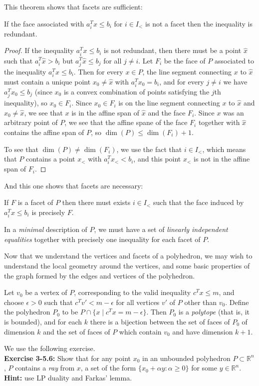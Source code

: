 \documentclass[12pt]{article}
\begin{document}
This theorem shows that facets are sufficient:
\begin{theorem}
If the face associated with $a_i^Tx\leq b_i$ for $i\in I_<$ is not a facet
then the inequality is redundant. 
\end{theorem}
\begin{proof} If the inequality $a_i^Tx \le b_i$ is not redundant, then there must be a point $\hat{x}$ such that $a_i^T\hat{x} > b_i$ but $a_j^T\hat{x} \le b_j$ for all $j \ne i$. Let $F_i$ be the face of $P$ associated to the inequality $a_i^Tx \le b_i$. Then for every $x \in P$, the line segment connecting $x$ to $\hat{x}$ must contain a unique point $x_0 \ne \hat{x}$ with $a_i^Tx_0 = b_i$, and for every $j \ne i$ we have $a_j^Tx_0 \le b_j$ (since $x_0$ is a convex combination of points satisfying the $j$th inequality), so $x_0 \in F_i$. Since $x_0 \in F_i$ is on the line segment connecting $x$ to $\hat{x}$ and $x_0 \ne \hat{x}$, we see that $x$ is in the affine span of $\hat{x}$ and the face $F_i$. Since $x$ was an arbitrary point of $P$, we see that the affine spane of the face $F_i$ together with $\hat{x}$ contains the affine span of $P$, so $\dim(P) \le \dim(F_i) + 1$.

To see that $\dim(P) \ne \dim(F_i)$, we use the fact that $i \in I_<$, which means that $P$ contains a point $x_<$ with $a_i^Tx_< < b_i$, and this point $x_<$ is not in the affine span of $F_i$.
\end{proof}

And this one shows that facets are necessary:
\begin{theorem}
If $F$ is a facet of $P$ then there must exists $i\in I_<$ such that
the face induced by $a_i^T x\leq b_i$ is precisely $F$. 
\end{theorem}

In a {\it minimal} description of $P$, we must have a set of {\it
  linearly independent equalities} together with precisely one
  inequality for each facet of $P$.

Now that we understand the vertices and facets of a polyhedron, we may wish to understand the local geometry around the vertices, and some basic properties of the graph formed by the edges and vertices of the polyhedron.

\begin{theorem} Let $v_0$ be a vertex of $P$, corresponding to the valid inequality $c^Tx \le m$, and choose $\epsilon > 0$ such that $c^Tv' < m-\epsilon$ for all vertices $v'$ of $P$ other than $v_0$. Define the polyhedron $P_0$ to be $P \cap \{x \mid c^Tx = m-\epsilon\}$. Then $P_0$ is a {\it polytope} (that is, it is bounded), and for each $k$ there is a bijection between the set of faces of $P_0$ of dimension $k$ and the set of faces of $P$ which contain $v_0$ and have dimension $k + 1$.
\end{theorem}
We use the following exercise.\\
\noindent \textbf{Exercise 3-5.6:} Show that for any point $x_0$ in an unbounded polyhedron $P \subset \mathbb{R}^n$, $P$ contains a \emph{ray} from $x$, a set of the form $\{x_0 + \alpha y: \alpha \geq 0\}$ for some $y \in \mathbb{R}^n$. \textbf{Hint:} use LP duality and Farkas' lemma.\\
\end{document}
